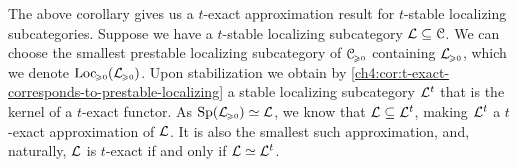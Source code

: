 

\begin{remark}
    The above corollary gives us a $t$-exact approximation result for $t$-stable localizing subcategories. Suppose we have a $t$-stable localizing subcategory $\mathcal{L}\subseteq \EuScript{C}$. We can choose the smallest prestable localizing subcategory of $\EuScript{C}_{\hspace{-1pt}\scriptscriptstyle\geqslant 0}$ containing $\mathcal{L}_{\hspace{-1pt}\scriptscriptstyle\geqslant 0}$, which we denote $\operatorname{Loc}_{\hspace{-1pt}\scriptscriptstyle\geqslant 0}(\mathcal{L}_{\hspace{-1pt}\scriptscriptstyle\geqslant 0})$. Upon stabilization we obtain by \cref{ch4:cor:t-exact-corresponds-to-prestable-localizing} a stable localizing subcategory $\mathcal{L}^t$
    that is the kernel of a $t$-exact functor. As $\mathrm{Sp}(\mathcal{L}_{\hspace{-1pt}\scriptscriptstyle\geqslant 0})\simeq \mathcal{L}$, we know that $\mathcal{L}\subseteq \mathcal{L}^t$, making $\mathcal{L}^t$ a $t$-exact approximation of $\mathcal{L}$. It is also the smallest such approximation, and, naturally, $\mathcal{L}$ is $t$-exact if and only if $\mathcal{L}\simeq \mathcal{L}^t$. 
\end{remark}




